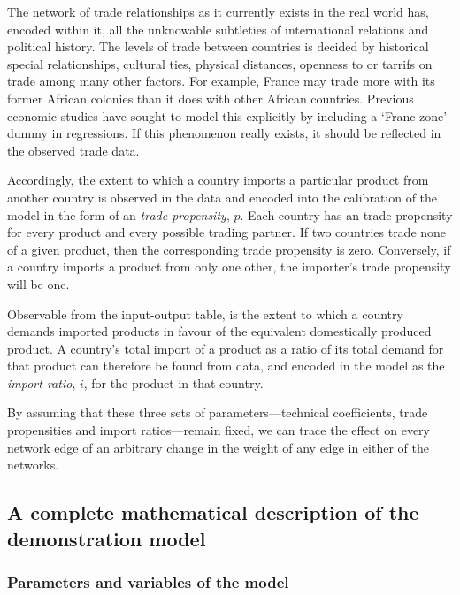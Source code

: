 \documentclass[preprint,authoryear,3p]{elsarticle}
\begin{document}
The network of trade relationships as it currently exists in the real world has, encoded within it, all the unknowable subtleties of international relations and political history. The levels of trade between countries is decided by historical special relationships, cultural ties, physical distances, openness to or tarrifs on trade among many other factors. For example, France may trade more with its former African colonies than it does with other African countries. Previous economic studies have sought to model this explicitly by including a `Franc zone' dummy in regressions. If this phenomenon really exists, it should be reflected in the observed trade data.

Accordingly, the extent to which a country imports a particular product from another country is observed in the data and encoded into the calibration of the model in the form of an \textit{trade propensity}, $p$. Each country has an trade propensity for every product and every possible trading partner. If two countries trade none of a given product, then the corresponding trade propensity is zero. Conversely, if a country imports a product from only one other, the importer's trade propensity will be one.

Observable from the input-output table, is the extent to which a country demands imported products in favour of the equivalent domestically produced product. A country's total import of a product as a ratio of its total demand for that product can therefore be found from data, and encoded in the model as the \textit{import ratio}, $i$, for the product in that country.

By assuming that these three sets of parameters---technical coefficients, trade propensities and import ratios---remain fixed, we can trace the effect on every network edge of an arbitrary change in the weight of any edge in either of the networks.





\pagebreak





\subsection{A complete mathematical description of the demonstration model}





\subsubsection{Parameters and variables of the model} \label{params_vars_of_model}
\end{document}

